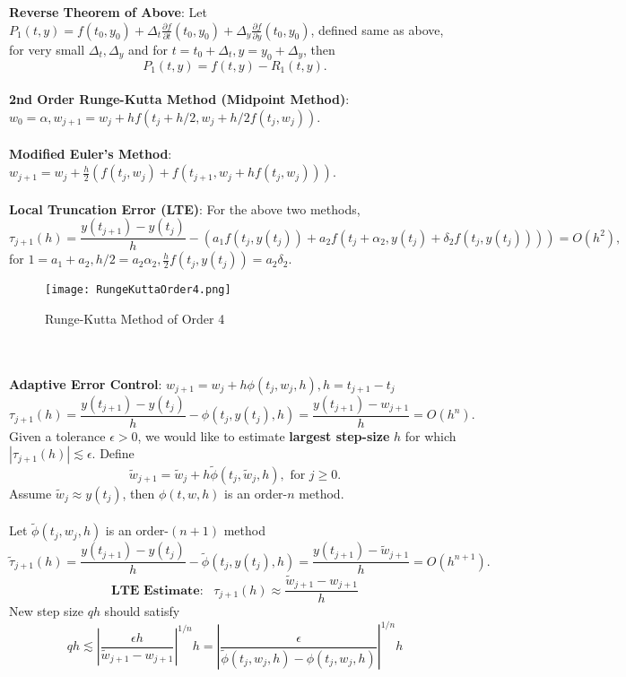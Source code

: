 \documentclass{article}
\begin{document}
\textbf{Reverse Theorem of Above}: Let $P_1(t, y) = f(t_0, y_0) + \Delta_t \frac{\partial f}{\partial t}(t_0, y_0) + \Delta_y \frac{\partial f}{\partial y}(t_0, y_0)$, defined same as above, for very small $\Delta_t, \Delta_y$ and for $t = t_0 + \Delta_t, y = y_0 + \Delta_y$, then $$P_1(t, y) = f(t, y) - R_1(t, y).$$ \\
\textbf{2nd Order Runge-Kutta Method (Midpoint Method)}: $w_0 = \alpha, w_{j + 1} = w_j + hf \left( t_j + h/2, w_j + h/2 f(t_j, w_j) \right)$. \\ \\
\textbf{Modified Euler's Method}: $w_{j + 1} = w_j + \frac{h}{2}(f(t_j, w_j) + f(t_{j + 1}, w_j + hf(t_j, w_j)))$. \\ \\
\textbf{Local Truncation Error (LTE)}: For the above two methods, $$\tau_{j + 1}(h) = \frac{y(t_{j + 1}) - y(t_j)}{h} - (a_1 f(t_j, y(t_j)) + a_2 f(t_j + \alpha_2, y(t_j) + \delta_2 f(t_j, y(t_j)))) = O(h^2),$$ for $1 = a_1 + a_2, h/2 = a_2 \alpha_2, \frac{h}{2} f(t_j, y(t_j)) = a_2 \delta_2$. \\
\begin{figure*}[htp]
    \centering
    \texttt{[image: RungeKuttaOrder4.png]}
    \caption{Runge-Kutta Method of Order 4}
\end{figure*} \\ \\
\textbf{Adaptive Error Control}: $w_{j + 1} = w_j + h \phi(t_j, w_j, h), h = t_{j + 1} - t_j$ $$\tau_{j + 1}(h) = \frac{y(t_{j + 1}) - y(t_j)}{h} - \phi(t_j, y(t_j), h) = \frac{y(t_{j + 1}) - w_{j + 1}}{h} = O(h^n).$$ Given a tolerance $\epsilon > 0$, we would like to estimate \textbf{largest step-size} $h$ for which $|\tau_{j + 1}(h)| \lesssim \epsilon.$ Define $$\tilde{w}_{j + 1} = \tilde{w}_j + h \tilde{\phi}(t_j, \tilde{w}_j, h), \text{ for } j \geq 0.$$ Assume $\tilde{w}_j \approx y(t_j)$, then $\phi(t, w, h)$ is an order-$n$ method. \\ \\
Let $\tilde{\phi}(t_j, w_j, h)$ is an order-$(n + 1)$ method $$\tilde{\tau}_{j + 1}(h) = \frac{y(t_{j + 1}) - y(t_j)}{h} - \tilde{\phi}(t_j, y(t_j), h) = \frac{y(t_{j + 1}) - \tilde{w}_{j + 1}}{h} = O(h^{n + 1}).$$
$$\textbf{LTE Estimate}: \text{ } \tau_{j + 1}(h) \approx \frac{\tilde{w}_{j + 1} - w_{j + 1}}{h}$$
New step size $qh$ should satisfy $$qh \lesssim \left| \frac{\epsilon h}{\tilde{w}_{j + 1} - w_{j + 1}} \right|^{1/n}h = \left| \frac{\epsilon}{\tilde{\phi}(t_j, w_j, h) - \phi(t_j, w_j, h)} \right|^{1/n} h$$ \\
\end{document}
